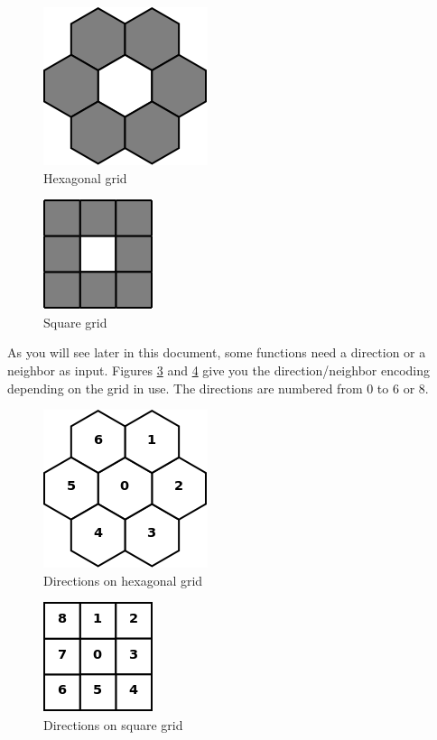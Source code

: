 \documentclass[a4paper,10pt,oneside]{article}
\begin{document}
\begin{figure}
\centering
\includegraphics[scale=0.3]{figures/hxGrid.png}
\caption{Hexagonal grid}
\label{fig:hxgrid}
\end{figure}

\begin{figure}
\centering
\includegraphics[scale=0.4]{figures/sqGrid.png}
\caption{Square grid}
\label{fig:sqgrid}
\end{figure}

As you will see later in this document, some functions need a direction or a 
neighbor as input. Figures \ref{fig:hxgriddir} and \ref{fig:sqgriddir} give you
the direction/neighbor encoding depending on the grid in use. The directions
are numbered from 0 to 6 or 8.

\begin{figure}
\centering
\includegraphics[scale=0.3]{figures/hxGriddir.png}
\caption{Directions on hexagonal grid}
\label{fig:hxgriddir}
\end{figure}

\begin{figure}
\centering
\includegraphics[scale=0.4]{figures/sqGriddir.png}
\caption{Directions on square grid}
\label{fig:sqgriddir}
\end{figure}
\end{document}
